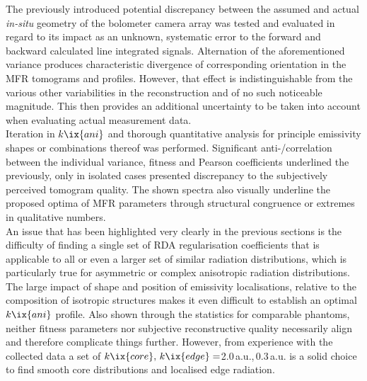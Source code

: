                 The previously introduced potential discrepancy between the assumed and actual \textit{in-situ} geometry of the bolometer camera array was tested and evaluated in regard to its impact as an unknown, systematic error to the forward and backward calculated line integrated signals. Alternation of the aforementioned variance produces characteristic divergence of corresponding orientation in the MFR tomograms and profiles. However, that effect is indistinguishable from the various other variabilities in the reconstruction and of no such noticeable magnitude. This then provides an additional uncertainty to be taken into account when evaluating actual measurement data.\\%
                Iteration in $k\ix{ani}$ and thorough quantitative analysis for principle emissivity shapes or combinations thereof was performed. Significant anti-/correlation between the individual variance, fitness and Pearson coefficients underlined the previously, only in isolated cases presented discrepancy to the subjectively perceived tomogram quality. The shown spectra also visually underline the proposed optima of MFR parameters through structural congruence or extremes in qualitative numbers.\\%
                An issue that has been highlighted very clearly in the previous sections is the difficulty of finding a single set of RDA regularisation coefficients that is applicable to all or even a larger set of similar radiation distributions, which is particularly true for asymmetric or complex anisotropic radiation distributions. The large impact of shape and position of emissivity localisations, relative to the composition of isotropic structures makes it even difficult to establish an optimal $k\ix{ani}$ profile. Also shown through the statistics for comparable phantoms, neither fitness parameters nor subjective reconstructive quality necessarily align and therefore complicate things further. However, from experience with the collected data a set of $k\ix{core},\,k\ix{edge}=$2.0\,a.u.,\,0.3\,a.u. is a solid choice to find smooth core distributions and localised edge radiation.%
%
